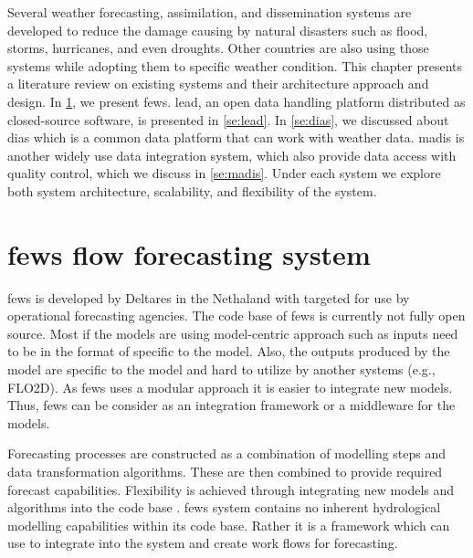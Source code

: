 Several weather forecasting, assimilation, and dissemination systems are developed to reduce the damage causing by natural disasters such as flood, storms, hurricanes, and even droughts. %
Other countries are also using those systems while adopting them %
to specific weather condition.%
This chapter presents a literature review on existing systems and their architecture approach and design. In \cref{se:fews}, we present \acrshort{fews}. \acrfull{lead}, an open data handling platform distributed as closed-source software, is presented in \cref{se:lead}. %
In \cref{se:dias}, we discussed about \acrfull{dias} which is a common data platform that can work with weather data. \acrfull{madis} is another widely use data integration system, which also provide data access with quality control, which we discuss in \cref{se:madis}.
Under each system we explore both system architecture, scalability, and flexibility of the system.



\section{\acrshort{fews} flow forecasting system}
\label{se:fews}

\acrshort{fews} \cite{Werner2013TheSystem} is developed by Deltares in the Nethaland with targeted for use by operational forecasting agencies. The code base of \acrshort{fews} is currently not fully open source.
Most if the models are using model-centric approach such as inputs need to be in the format of specific to the model. Also, the outputs produced by the model are specific to the model and hard to utilize by another systems (e.g., FLO2D). As \acrshort{fews} uses a modular approach it is easier to integrate new models. 
Thus, \acrshort{fews} can be consider as an integration framework or a middleware for the models.

Forecasting processes are constructed as a combination of modelling steps and data transformation algorithms. These are then combined to provide required forecast capabilities. Flexibility is achieved through integrating new models and algorithms into the code base \cite{Werner2013TheSystem}. \acrshort{fews} system contains no inherent hydrological modelling capabilities within its code base. Rather it is a framework which can use to integrate into the system and create work flows for forecasting.

